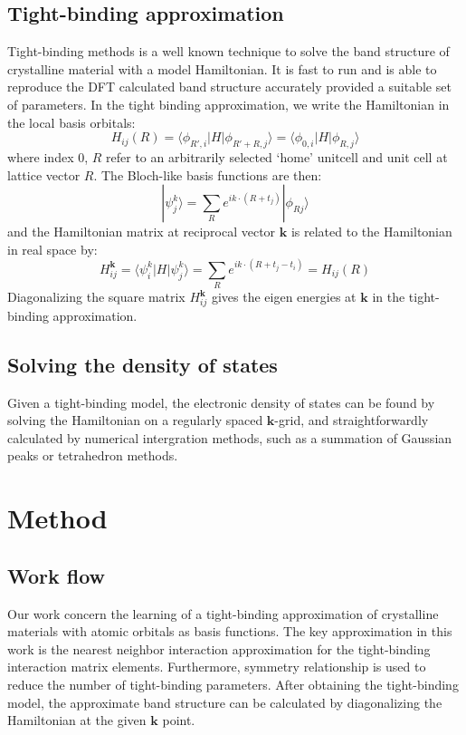 \documentclass{article}
\begin{document}
\subsection{Tight-binding approximation}
Tight-binding methods is a well known technique to solve the band structure of 
crystalline material with a model Hamiltonian\cite{ziman_principles_1999}. 
It is fast to run and is able to 
reproduce the DFT calculated band structure accurately provided a suitable set of 
parameters. 
In the tight binding approximation, we write the Hamiltonian in the local 
basis orbitals:
\begin{equation}
    H_{ij}(R) = \langle \phi_{R',i} | H | \phi_{R'+R,j} \rangle = \langle \phi_{0,i} | H | \phi_{R,j} \rangle
\end{equation}
where index 0, $R$ refer to an arbitrarily selected `home' unitcell and unit cell at 
lattice vector $R$. The Bloch-like basis functions are then:
\begin{equation}
    |\psi_j^k\rangle = \sum_R e^{ik\cdot(R+t_j)} |\phi_{Rj} \rangle
\end{equation}
and the Hamiltonian matrix at reciprocal vector $\mathbf{k}$ is related to the 
Hamiltonian in real space by:
\begin{equation}
    H_{ij}^{\mathbf{k}} = \langle \psi_i^k | H |\psi_j^k\rangle = \sum_R e^{ik\cdot(R+t_j-t_i)} = H_{ij}(R)
\end{equation}
Diagonalizing the square matrix $H_{ij}^{\mathbf{k}}$ gives the eigen energies at $\mathbf{k}$
in the tight-binding approximation. 

\subsection{Solving the density of states}
Given a tight-binding model, the electronic density of states can be found by solving the 
Hamiltonian on a regularly spaced $\mathbf{k}$-grid, and straightforwardly calculated 
by numerical intergration methods, such as a summation of Gaussian peaks or tetrahedron methods. 

\section{Method}
\subsection{Work flow}
Our work concern the learning of a tight-binding approximation of crystalline materials 
with atomic orbitals as basis functions. The key approximation in this work is the 
nearest neighbor interaction approximation for the tight-binding interaction matrix elements. 
Furthermore, symmetry relationship is used to reduce the number of tight-binding parameters.
After obtaining the tight-binding model, the approximate band structure can be calculated 
by diagonalizing the Hamiltonian at the given $\mathbf{k}$ point. 
\end{document}
